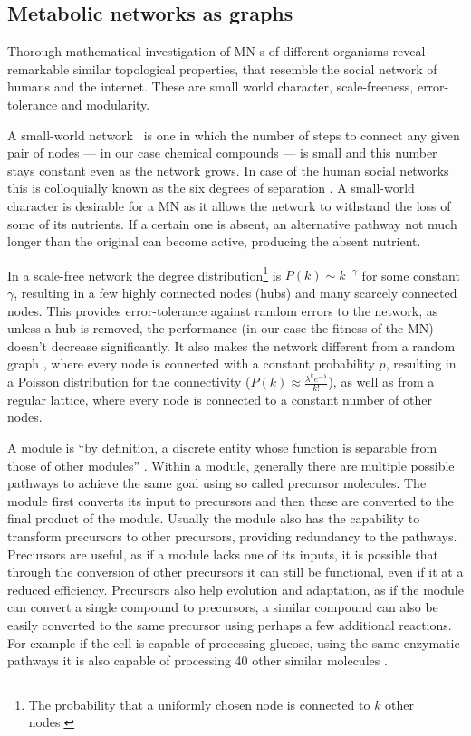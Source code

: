 \documentclass[a4paper,12pt]{article}
\begin{document}
	\subsection{Metabolic networks as graphs}
	Thorough mathematical investigation of MN-s of different organisms reveal remarkable similar topological properties, that resemble the social network of humans and the internet. These are small world character, scale-freeness, error-tolerance and modularity\cite{largescale}.	

	A small-world network \cite{smallworld}~is one in which the number of steps to connect any given pair of nodes --- in our case chemical compounds --- is small and this number stays constant even as the network grows. In case of the human social networks this is colloquially known as the six degrees of separation \cite{sixdegrees}. A small-world character is desirable for a MN as it allows the network to withstand the loss of some of its nutrients. If a certain one is absent, an alternative pathway not much longer than the original can become active, producing the absent nutrient. %
	 
	In a scale-free network the degree distribution\footnote{The probability that a uniformly chosen node is connected to $k$ other nodes.} is $P(k)\sim k^{-\gamma}$ for some constant $\gamma$, resulting in a few highly connected nodes (hubs) and many scarcely connected nodes. This provides error-tolerance against random errors to the network, as unless a hub is removed, the performance (in our case the fitness of the MN) doesn't decrease significantly. It also makes the network different from a random graph \cite{randomgraphs}, where every node is connected with a constant probability $p$, resulting in a Poisson distribution for the connectivity ($P(k) \approx \frac{\lambda^k e^{-\lambda}}{k!} $), as well as from a regular lattice, where every node is connected to a constant number of other nodes.
	 
	A module is ``by definition, a discrete entity whose function is separable from those of other modules'' \cite{modulardef}. Within a module, generally there are multiple possible pathways to achieve the same goal using so called precursor molecules. The module first converts its input to precursors and then these are converted to the final product of the module. Usually the module also has the capability to transform precursors to other precursors, providing redundancy to the pathways. Precursors are useful, as if a module lacks one of its inputs, it is possible that through the conversion of other precursors it can still be functional, even if it at a reduced efficiency. Precursors also help evolution and adaptation, as if the module can convert a single compound to precursors, a similar compound can also be easily converted to the same precursor using perhaps a few additional reactions. For example if the cell is capable of processing glucose, using the same enzymatic pathways it is also capable of processing 40 other similar molecules \cite{latent}.
	
\end{document}
